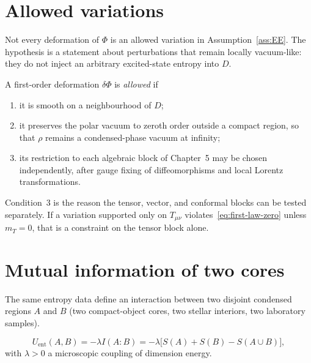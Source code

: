 \section{Allowed variations}
\label{sec:ch6-allowed}

Not every deformation of \(\Phi\) is an allowed variation in
Assumption~\ref{ass:EE}. The hypothesis is a statement about
perturbations that remain locally vacuum-like: they do not inject
an arbitrary excited-state entropy into \(D\).

\begin{definition}
  \label{def:allowed}
  A first-order deformation \(\delta\Phi\) is \emph{allowed} if
  \begin{enumerate}
    \item it is smooth on a neighbourhood of \(D\);
    \item it preserves the polar vacuum to zeroth order outside a
          compact region, so that \(\rho\) remains a condensed-phase
          vacuum at infinity;
    \item its restriction to each algebraic block of
          Chapter~5 may be chosen independently, after gauge fixing
          of diffeomorphisms and local Lorentz transformations.
  \end{enumerate}
\end{definition}

Condition~3 is the reason the tensor, vector, and conformal blocks
can be tested separately. If a variation supported only on
\(T_{\mu\nu}\) violates~\eqref{eq:first-law-zero} unless
\(m_T=0\), that is a constraint on the tensor block alone.

\section{Mutual information of two cores}
\label{sec:ch6-MI}

The same entropy data define an interaction between two disjoint
condensed regions \(A\) and \(B\) (two compact-object cores, two
stellar interiors, two laboratory samples).

\begin{definition}
  \label{def:Uent}
  \begin{equation}
    \label{eq:Uent-def}
    U_{\mathrm{ent}}(A,B)
    =-\lambda I(A:B)
    =-\lambda\bigl[S(A)+S(B)-S(A\cup B)\bigr],
  \end{equation}
  with \(\lambda>0\) a microscopic coupling of dimension energy.
\end{definition}

